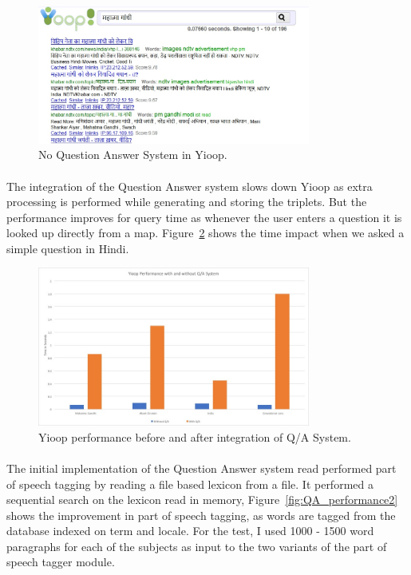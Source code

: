 \begin{figure}[htb]
\centering
\includegraphics[width=0.8\textwidth]{images/Yioop_NoQA.jpg}
\caption{No Question Answer System in Yioop.} 
\label{fig:Yioop_NoQA}
\end{figure}

\paragraph{}
The integration of the Question Answer system slows down Yioop as extra processing is performed while generating and storing the triplets. But the performance improves for query time as whenever the  user enters a question it is looked up directly from a map. Figure~\ref{fig:QA_performance1} shows the time impact when we asked a simple question in Hindi.

\begin{figure}[htb]
\centering
\includegraphics[width=0.8\textwidth]{images/Yioopwith_withoutQA_Hindi.jpg}
\caption{Yioop performance before and after integration of Q/A System.} 
\label{fig:QA_performance1}
\end{figure}

\paragraph{}
The initial implementation of the Question Answer system read performed part of speech tagging by reading a file based lexicon from a file. It performed a sequential search on the lexicon read in memory, Figure~\ref{fig:QA_performance2} shows the improvement in part of speech tagging, as words are tagged from the database indexed on term and locale. For the test, I used 1000 - 1500 word paragraphs for each of the subjects as input to the two variants of the part of speech tagger module.

